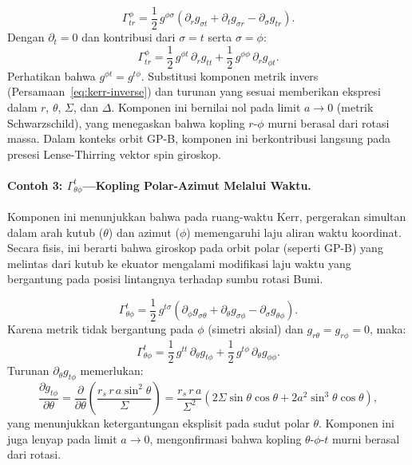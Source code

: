 \begin{equation}
    \Gamma^\phi_{tr} = \frac{1}{2}\,g^{\phi\sigma}
    \left(\partial_r g_{\sigma t} + \partial_t g_{\sigma r} - \partial_\sigma g_{tr}\right).
\end{equation}
Dengan $\partial_t = 0$ dan kontribusi dari $\sigma = t$ serta $\sigma = \phi$:
\begin{equation}
    \Gamma^\phi_{tr} = \frac{1}{2}\,g^{\phi t}\,\partial_r g_{tt}
                     + \frac{1}{2}\,g^{\phi\phi}\,\partial_r g_{\phi t}.
    \label{eq:christoffel-phitr}
\end{equation}
Perhatikan bahwa $g^{\phi t} = g^{t\phi}$. Substitusi komponen metrik invers (Persamaan~\ref{eq:kerr-inverse}) dan turunan yang sesuai memberikan ekspresi dalam $r$, $\theta$, $\Sigma$, dan $\Delta$. Komponen ini bernilai nol pada limit $a \to 0$ (metrik Schwarzschild), yang menegaskan bahwa kopling $r$-$\phi$ murni berasal dari rotasi massa. Dalam konteks orbit GP-B, komponen ini berkontribusi langsung pada presesi Lense-Thirring vektor spin giroskop.

\paragraph{Contoh 3: $\Gamma^t_{\theta\phi}$---Kopling Polar-Azimut Melalui Waktu.}
Komponen ini menunjukkan bahwa pada ruang-waktu Kerr, pergerakan simultan dalam arah kutub ($\theta$) dan azimut ($\phi$) memengaruhi laju aliran waktu koordinat. Secara fisis, ini berarti bahwa giroskop pada orbit polar (seperti GP-B) yang melintas dari kutub ke ekuator mengalami modifikasi laju waktu yang bergantung pada posisi lintangnya terhadap sumbu rotasi Bumi.

\begin{equation}
    \Gamma^t_{\theta\phi} = \frac{1}{2}\,g^{t\sigma}
    \left(\partial_\phi g_{\sigma\theta} + \partial_\theta g_{\sigma\phi} - \partial_\sigma g_{\theta\phi}\right).
\end{equation}
Karena metrik tidak bergantung pada $\phi$ (simetri aksial) dan $g_{r\theta} = g_{r\phi} = 0$, maka:
\begin{equation}
    \Gamma^t_{\theta\phi} = \frac{1}{2}\,g^{tt}\,\partial_\theta g_{t\phi}
                          + \frac{1}{2}\,g^{t\phi}\,\partial_\theta g_{\phi\phi}.
    \label{eq:christoffel-tthetaphi}
\end{equation}
Turunan $\partial_\theta g_{t\phi}$ memerlukan:
\begin{equation}
    \frac{\partial g_{t\phi}}{\partial\theta}
    = \frac{\partial}{\partial\theta}
    \!\left(\frac{r_s\, r\, a\sin^2\!\theta}{\Sigma}\right)
    = \frac{r_s\, r\, a}{\Sigma^2}
    \left(2\Sigma\sin\theta\cos\theta + 2a^2\sin^3\!\theta\cos\theta\right),
\end{equation}
yang menunjukkan ketergantungan eksplisit pada sudut polar $\theta$. Komponen ini juga lenyap pada limit $a \to 0$, mengonfirmasi bahwa kopling $\theta$-$\phi$-$t$ murni berasal dari rotasi.

